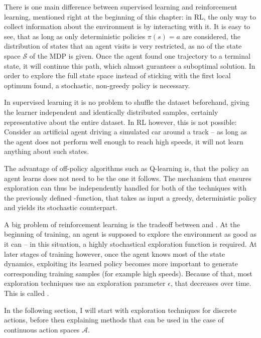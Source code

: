 \label{sec:exploration}

There is one main difference between supervised learning and reinforcement learning, mentioned right at the beginning of this chapter: in RL, the only way to collect information about the environment is by interacting with it. It is easy to see, that as long as only deterministic policies $\pi(s) = a$ are considered, the distribution of states that an agent visits is very restricted, as no  of the state space $\mathcal{S}$ of the MDP is given. Once the agent found one trajectory to a terminal state, it will continue  this path, which almost gurantees a suboptimal solution. In order to explore the full state space instead of sticking with the first local optimum found, a stochastic, non-greedy policy is necessary.

In supervised learning it is no problem to shuffle the dataset beforehand, giving the learner independent and identically distributed samples, certainly representative about the entire dataset. In RL however, this is not possible: Consider an artificial agent driving a simulated car around a track -- as long as the agent does not perform well enough to reach high speeds, it will not learn anything about such states. 

The advantage of off-policy algorithms such as Q-learning is, that the policy an agent learns does not need to be the one it follows. The mechanism that ensures exploration can thus be independently handled for both of the techniques with the previously defined -function, that takes as input a greedy, deterministic policy and yields its stochastic counterpart.

A big problem of reinforcement learning is the tradeoff between  and . At the beginning of training, an agent is supposed to explore the environment as good as it can -- in this situation, a highly stochastical exploration function is required. At later stages of training however, once the agent knows most of the state dynamics, exploiting its learned policy becomes more important to generate corresponding training samples (for example high speeds). Because of that, most exploration techniques use an exploration parameter $\epsilon$, that decreases over time. This is called .

In the following section, I will start with exploration techniques for discrete actions, before then explaining methods that can be used in the case of continuous action spaces $\mathcal{A}$.



